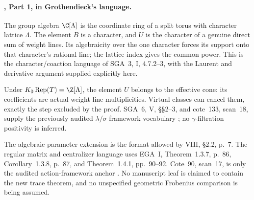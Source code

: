 \paragraph{, Part 1, in Grothendieck's language.}
The group algebra $\C[\Lambda]$ is the coordinate
ring of a split torus with character lattice
$\Lambda$. The element $B$ is a character, and
$U$ is the character of a genuine direct sum of
weight lines. Its algebraicity over the one
character forces its support onto that character's
rational line; the lattice index gives the common
power. This is the character/coaction language of
SGA~3, I, 4.7.2--3, with the Laurent and derivative
argument supplied explicitly here.

Under $K_0\operatorname{Rep}(T)=\Z[\Lambda]$, the
element $U$ belongs to the effective cone: its
coefficients are actual weight-line multiplicities.
Virtual classes can cancel them, exactly the step
excluded by the proof.
SGA~6, V, \S\S2--3, and cote~133, scan~18, supply
the previously audited $\lambda/\sigma$ framework
vocabulary \cite{SGA6,Archive}; no $\gamma$-filtration
positivity is inferred.

The algebraic parameter extension is the format
allowed by VIII, \S2.2, p.~7.
The regular matrix and centralizer language uses
EGA~I, Theorem~1.3.7, p.~86, Corollary~1.3.8,
p.~87, and Theorem~1.4.1, pp.~90--92.
Cote~90, scan~17, is only the audited action-framework
anchor \cite{VIII,EGA,SGA3,Archive}.
No manuscript leaf is claimed to contain the new
trace theorem, and no unspecified geometric
Frobenius comparison is being assumed.

